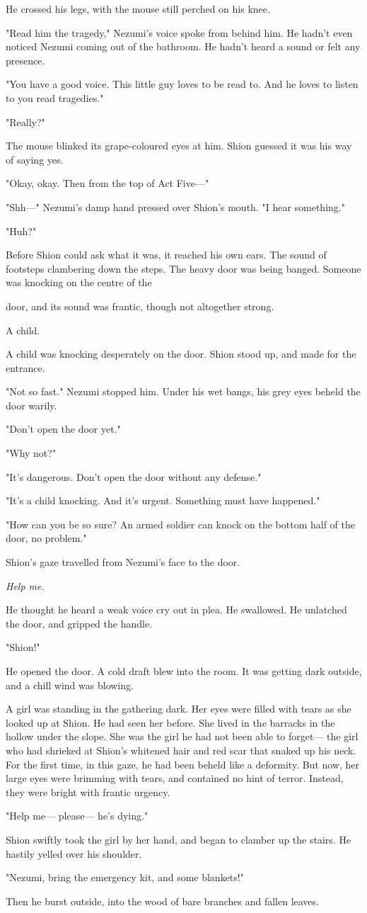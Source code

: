 He crossed his legs, with the mouse still perched on his knee.

"Read him the tragedy," Nezumi's voice spoke from behind him. He hadn't
even noticed Nezumi coming out of the bathroom. He hadn't heard a sound
or felt any presence.

"You have a good voice. This little guy loves to be read to. And he
loves to listen to you read tragedies."

"Really?"

The mouse blinked its grape-coloured eyes at him. Shion guessed it was
his way of saying yes.

"Okay, okay. Then from the top of Act Five---"

"Shh---" Nezumi's damp hand pressed over Shion's mouth. "I hear
something."

"Huh?"

Before Shion could ask what it was, it reached his own ears. The sound
of footsteps clambering down the steps. The heavy door was being banged.
Someone was knocking on the centre of the~

door, and its sound was frantic, though not altogether strong.

A child.

A child was knocking desperately on the door. Shion stood up, and made
for the entrance.

"Not so fast." Nezumi stopped him. Under his wet bangs, his grey eyes
beheld the door warily.

"Don't open the door yet."

"Why not?"

"It's dangerous. Don't open the door without any defense."

"It's a child knocking. And it's urgent. Something must have happened."

"How can you be so sure? An armed soldier can knock on the bottom half
of the door, no problem."

Shion's gaze travelled from Nezumi's face to the door.

\emph{Help me.}

He thought he heard a weak voice cry out in plea. He swallowed. He
unlatched the door, and gripped the handle.

"Shion!"

He opened the door. A cold draft blew into the room. It was getting dark
outside, and a chill wind was blowing.

A girl was standing in the gathering dark. Her eyes were filled with
tears as she looked up at Shion. He had seen her before. She lived in
the barracks in the hollow under the slope. She was the girl he had not
been able to forget--- the girl who had shrieked at Shion's whitened hair
and red scar that snaked up his neck. For the first time, in this gaze,
he had been beheld like a deformity. But now, her large eyes were
brimming with tears, and contained no hint of terror. Instead, they were
bright with frantic urgency.~

"Help me--- please--- he's dying."

Shion swiftly took the girl by her hand, and began to clamber up the
stairs. He hastily yelled over his shoulder.

"Nezumi, bring the emergency kit, and some blankets!"

Then he burst outside, into the wood of bare branches and fallen leaves.